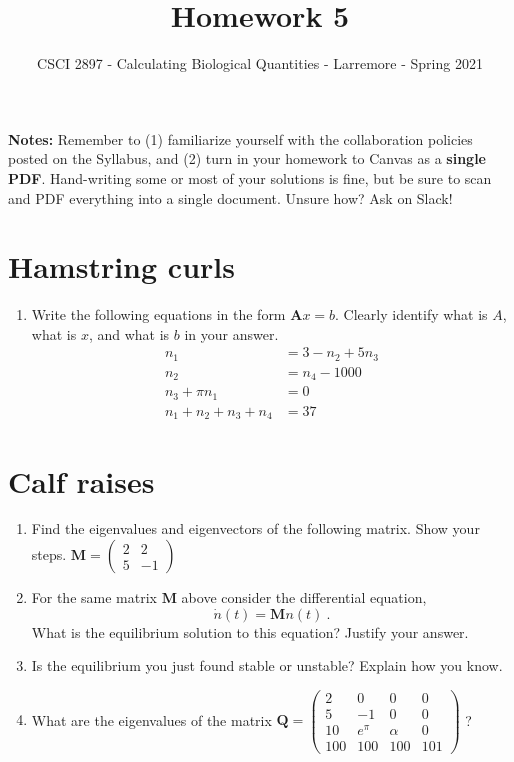 \documentclass[11pt,onecolumn,superscriptaddress,notitlepage]{article}
\date{}
\begin{document}
\author{CSCI 2897 - Calculating Biological Quantities - Larremore - Spring 2021}
\title{Homework 5}
\maketitle

{\bf Notes:} Remember to (1) familiarize yourself with the collaboration policies posted on the Syllabus, and (2) turn in your homework to Canvas as a {\bf single PDF}. Hand-writing some or most of your solutions is fine, but be sure to scan and PDF everything into a single document. Unsure how? Ask on Slack! 

\section*{Hamstring curls}

\begin{enumerate}
\item Write the following equations in the form $\mathbf{A}x=b$. Clearly identify what is $A$, what is $x$, and what is $b$ in your answer.
\begin{align}
	n_1 &= 3 - n_2 + 5 n_3 \nonumber \\
	n_2 &= n_4 - 1000 \nonumber \\
	n_3 + \pi n_1 &= 0 \nonumber \\
	n_1+n_2 + n_3 + n_4 &= 37 \nonumber 
\end{align}
\end{enumerate}

\section*{Calf raises} 

\begin{enumerate}[resume]
\item Find the eigenvalues and eigenvectors of the following matrix. Show your steps.
$\mathbf{M}=
\begin{pmatrix}
2 & 2  \\ 
5 & -1
\end{pmatrix}$
\item For the same matrix $\mathbf{M}$ above consider the differential equation,
$$ \dot{n}(t) = \mathbf{M}n(t)\ .$$
What is the equilibrium solution to this equation? Justify your answer.
\item Is the equilibrium you just found stable or unstable? Explain how you know.
\item What are the eigenvalues of the matrix 
$\mathbf{Q}=
\begin{pmatrix}
2 & 0 & 0 & 0 \\ 
5 & -1 & 0 & 0 \\
10 & e^{\pi} & \alpha & 0 \\
100 & 100 & 100 & 101
\end{pmatrix}$ ?
\end{enumerate}
\end{document}
